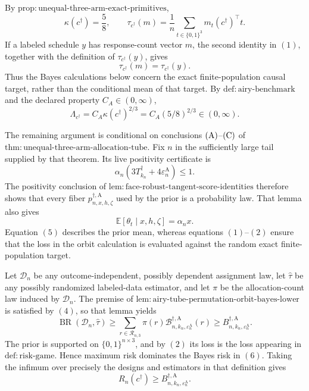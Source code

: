 By \(\mathrm{prop:unequal\text{-}three\text{-}arm\text{-}exact\text{-}primitives}\),
\[
 \kappa(c^\dagger)=\frac58,
 \qquad
 \tau_{c^\dagger}(m)=\frac1n\sum_{t\in\{0,1\}^3}
 m_t(c^\dagger)^\top t.                                      \tag{1}
\]
If a labeled schedule \(y\) has response-count vector \(m\), the second
identity in \((1)\), together with the definition of \(\tau_{c^\dagger}(y)\),
gives
\[
 \tau_{c^\dagger}(m)=\tau_{c^\dagger}(y).                    \tag{2}
\]
Thus the Bayes calculations below concern the exact finite-population causal
target, rather than the conditional mean of that target.  By
\(\mathrm{def:airy\text{-}benchmark}\) and the declared property
\(C_A\in(0,\infty)\),
\[
 \Lambda_{c^\dagger}
 =C_A\kappa(c^\dagger)^{2/3}
 =C_A(5/8)^{2/3}\in(0,\infty).                               \tag{3}
\]

The remaining argument is conditional on conclusions \({\rm(A)}\)--\({\rm(C)}\)
of \(\mathrm{thm:unequal\text{-}three\text{-}arm\text{-}allocation\text{-}tube}\).
Fix \(n\) in the sufficiently large tail supplied by that theorem.  Its live
positivity certificate is
\[
 \alpha_n(3T_{k_n}^\dagger+4\varepsilon_n^{\mathrm A})\le1.  \tag{4}
\]
The positivity conclusion of
\(\mathrm{lem:face\text{-}robust\text{-}tangent\text{-}score\text{-}identities}\)
therefore shows that every fiber
\(p_{n,x,h,\zeta}^{\dagger,\mathrm A}\) used by the prior is a probability
law.  That lemma also gives
\[
 \mathbb E[\theta_t\mid x,h,\zeta]=\alpha_nx.                \tag{5}
\]
Equation \((5)\) describes the prior mean, whereas equations \((1)\)--\((2)\)
ensure that the loss in the orbit calculation is evaluated against the random
exact finite-population target.

Let \(\mathcal D_n\) be any outcome-independent, possibly dependent assignment
law, let \(\widehat\tau\) be any possibly randomized labeled-data estimator,
and let \(\pi\) be the allocation-count law induced by \(\mathcal D_n\).
The premise of
\(\mathrm{lem:airy\text{-}tube\text{-}permutation\text{-}orbit\text{-}bayes\text{-}lower}\)
is satisfied by \((4)\), so that lemma yields
\[
 \operatorname{BR}(\mathcal D_n,\widehat\tau)
 \ge \sum_{r\in\mathcal R_{n,3}}\pi(r)
       \mathcal B_{n,k_n,\varepsilon_n^{\mathrm A}}^{\dagger,\mathrm A}(r)
 \ge B_{n,k_n,\varepsilon_n^{\mathrm A}}^{\dagger,\mathrm A}. \tag{6}
\]
The prior is supported on \(\{0,1\}^{n\times3}\), and by \((2)\) its loss is
the loss appearing in \(\mathrm{def:risk\text{-}game}\).  Hence maximum risk
dominates the Bayes risk in \((6)\).  Taking the infimum over precisely the
designs and estimators in that definition gives
\[
 R_n(c^\dagger)
 \ge B_{n,k_n,\varepsilon_n^{\mathrm A}}^{\dagger,\mathrm A}. \tag{7}
\]

